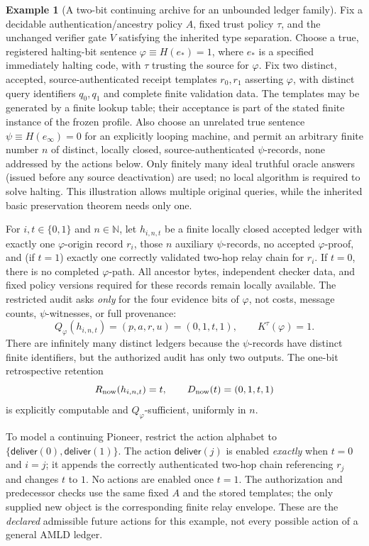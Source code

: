 \documentclass[11pt,letterpaper]{article}
\theoremstyle{definition}
\newtheorem{example}[theorem]{Example}
\newcommand{\N}{\mathbb N}
\begin{document}
\begin{example}[A two-bit continuing archive for an unbounded ledger family]\label{ex:concrete-ledger}
Fix a decidable authentication/ancestry policy $A$, fixed trust policy $\tau$, and the unchanged verifier gate $V$ satisfying the inherited type separation. Choose a true, registered halting-bit sentence $\varphi\equiv H(e_*)=1$, where $e_*$ is a specified immediately halting code, with $\tau$ trusting the source for $\varphi$. Fix two distinct, accepted, source-authenticated receipt templates $r_0,r_1$ asserting $\varphi$, with distinct query identifiers $q_0,q_1$ and complete finite validation data. The templates may be generated by a finite lookup table; their acceptance is part of the stated finite instance of the frozen profile. Also choose an unrelated true sentence $\psi\equiv H(e_\infty)=0$ for an explicitly looping machine, and permit an arbitrary finite number $n$ of distinct, locally closed, source-authenticated $\psi$-records, none addressed by the actions below. Only finitely many ideal truthful oracle answers (issued before any source deactivation) are used; no local algorithm is required to solve halting. This illustration allows multiple original queries, while the inherited basic preservation theorem needs only one.

For $i,t\in\{0,1\}$ and $n\in\N$, let $h_{i,n,t}$ be a finite locally closed accepted ledger with exactly one $\varphi$-origin record $r_i$, those $n$ auxiliary $\psi$-records, no accepted $\varphi$-proof, and (if $t=1$) exactly one correctly validated two-hop relay chain for $r_i$. If $t=0$, there is no completed $\varphi$-path. All ancestor bytes, independent checker data, and fixed policy versions required for these records remain locally available. The restricted audit asks \emph{only} for the four evidence bits of $\varphi$, not costs, message counts, $\psi$-witnesses, or full provenance:
\[
Q_{\varphi}(h_{i,n,t})=(p,a,r,u)=(0,1,t,1),
\qquad K^\tau(\varphi)=1.
\]
There are infinitely many distinct ledgers because the $\psi$-records have distinct finite identifiers, but the authorized audit has only two outputs. The one-bit retrospective retention
\[
R_{\rm now}(h_{i,n,t})=t,\qquad D_{\rm now}(t)=(0,1,t,1)
\]
is explicitly computable and $Q_{\varphi}$-sufficient, uniformly in $n$.

To model a continuing Pioneer, restrict the action alphabet to $\{\mathsf{deliver}(0),\mathsf{deliver}(1)\}$. The action $\mathsf{deliver}(j)$ is enabled \emph{exactly} when $t=0$ and $i=j$; it appends the correctly authenticated two-hop chain referencing $r_j$ and changes $t$ to $1$. No actions are enabled once $t=1$. The authorization and predecessor checks use the same fixed $A$ and the stored templates; the only supplied new object is the corresponding finite relay envelope. These are the \emph{declared} admissible future actions for this example, not every possible action of a general AMLD ledger.


\end{example}
\end{document}

